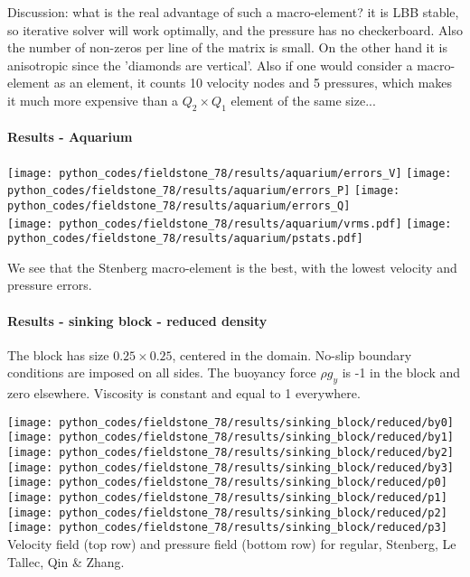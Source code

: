 Discussion: what is the real advantage of such a macro-element? it is LBB stable, so 
iterative solver will work optimally, and the pressure has no checkerboard. 
Also the number of non-zeros per line of the matrix is small.  
On the other hand it is anisotropic since the 'diamonds are vertical'. 
Also if one would consider a macro-element as an element, it counts 10 velocity nodes and 5 pressures, 
which makes it much more expensive than a $Q_2\times Q_1$ element of the same size...






\newpage
\paragraph{Results - Aquarium}


\begin{center}
\texttt{[image: python\_codes/fieldstone\_78/results/aquarium/errors\_V]}
\texttt{[image: python\_codes/fieldstone\_78/results/aquarium/errors\_P]}
\texttt{[image: python\_codes/fieldstone\_78/results/aquarium/errors\_Q]}\\
\texttt{[image: python\_codes/fieldstone\_78/results/aquarium/vrms.pdf]}
\texttt{[image: python\_codes/fieldstone\_78/results/aquarium/pstats.pdf]}
\end{center}

We see that the Stenberg macro-element is the best, with the lowest velocity and pressure errors.


\newpage
\paragraph{Results - sinking block - reduced density}

The block has size $0.25\times 0.25$, centered in the domain. No-slip boundary conditions are imposed on all 
sides. The buoyancy force $\rho g_y$ is -1 in the block and zero elsewhere. Viscosity is constant and 
equal to 1 everywhere. 

\begin{center}
\texttt{[image: python\_codes/fieldstone\_78/results/sinking\_block/reduced/by0]}
\texttt{[image: python\_codes/fieldstone\_78/results/sinking\_block/reduced/by1]}
\texttt{[image: python\_codes/fieldstone\_78/results/sinking\_block/reduced/by2]}
\texttt{[image: python\_codes/fieldstone\_78/results/sinking\_block/reduced/by3]}\\
\texttt{[image: python\_codes/fieldstone\_78/results/sinking\_block/reduced/p0]}
\texttt{[image: python\_codes/fieldstone\_78/results/sinking\_block/reduced/p1]}
\texttt{[image: python\_codes/fieldstone\_78/results/sinking\_block/reduced/p2]}
\texttt{[image: python\_codes/fieldstone\_78/results/sinking\_block/reduced/p3]}\\
{\captionfont Velocity field (top row) and pressure field (bottom row) 
for regular, Stenberg, Le Tallec, Qin \& Zhang.} 
\end{center}


